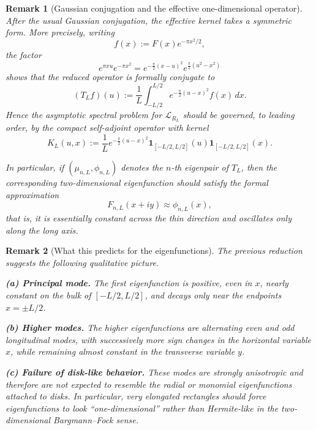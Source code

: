 \documentclass[a4paper,11pt,reqno]{amsart}
\newtheorem{remark}{Remark}[section]
\begin{document}
\begin{remark}[Gaussian conjugation and the effective one-dimensional operator]
After the usual Gaussian conjugation, the effective kernel takes a symmetric
form. More precisely, writing
\[
f(x):=F(x)e^{-\pi x^2/2},
\]
the factor
\[
e^{\pi xu}e^{-\pi x^2}
=
e^{-\frac{\pi}{2}(x-u)^2}e^{\frac{\pi}{2}(u^2-x^2)}
\]
shows that the reduced operator is formally conjugate to
\[
(T_Lf)(u)
:=
\frac1L\int_{-L/2}^{L/2}e^{-\frac{\pi}{2}(u-x)^2}f(x)\,dx.
\]
Hence the asymptotic spectral problem for $\mathcal L_{R_L}$ should be governed,
to leading order, by the compact self-adjoint operator with kernel
\[
K_L(u,x):=\frac1L e^{-\frac{\pi}{2}(u-x)^2}
\mathbf 1_{[-L/2,L/2]}(u)\mathbf 1_{[-L/2,L/2]}(x).
\]

In particular, if $(\mu_{n,L},\phi_{n,L})$ denotes the $n$-th eigenpair of
$T_L$, then the corresponding two-dimensional eigenfunction should satisfy the
formal approximation
\[
F_{n,L}(x+iy)\approx \phi_{n,L}(x),
\]
that is, it is essentially constant across the thin direction and oscillates
only along the long axis.
\end{remark}

\begin{remark}[What this predicts for the eigenfunctions]
The previous reduction suggests the following qualitative picture.

\smallskip
\textbf{(a) Principal mode.}
The first eigenfunction is positive, even in $x$, nearly constant on the bulk of
$[-L/2,L/2]$, and decays only near the endpoints $x=\pm L/2$.

\smallskip
\textbf{(b) Higher modes.}
The higher eigenfunctions are alternating even and odd longitudinal modes, with
successively more sign changes in the horizontal variable $x$, while remaining
almost constant in the transverse variable $y$.

\smallskip
\textbf{(c) Failure of disk-like behavior.}
These modes are strongly anisotropic and therefore are not expected to resemble
the radial or monomial eigenfunctions attached to disks. In particular, very
elongated rectangles should force eigenfunctions to look ``one-dimensional''
rather than Hermite-like in the two-dimensional Bargmann--Fock sense.
\end{remark}
\end{document}
